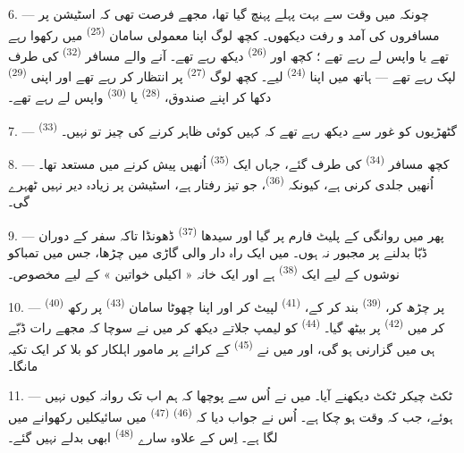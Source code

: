6. --- چونکہ میں وقت سے بہت پہلے پہنچ گیا تھا، مجھے فرصت تھی کہ
اسٹیشن پر مسافروں کی آمد و رفت دیکھوں۔ کچھ لوگ اپنا معمولی سامان
 \textsuperscript{(25)} میں رکھوا رہے تھے یا
واپس لے رہے تھے ؛ کچھ اور 
\textsuperscript{(26)} دیکھ رہے تھے۔ آنے والے مسافر 
\textsuperscript{(32)} کی طرف لپک رہے تھے — ہاتھ میں اپنا
 \textsuperscript{(24)} لیے۔ کچھ لوگ  \textsuperscript{(27)} پر انتظار کر رہے تھے اور اپنی
 \textsuperscript{(29)} دکھا کر اپنے صندوق،
 \textsuperscript{(28)} یا 
\textsuperscript{(30)} واپس لے رہے تھے۔

7. ---  \textsuperscript{(33)} گٹھڑیوں کو
غور سے دیکھ رہے تھے کہ کہیں کوئی ظاہر کرنے کی چیز تو نہیں۔

8. --- کچھ مسافر  \textsuperscript{(34)} کی طرف
گئے، جہاں ایک  \textsuperscript{(35)} اُنھیں پیش کرنے میں
مستعد تھا۔ اُنھیں جلدی کرنی ہے، کیونکہ 
\textsuperscript{(36)}، جو تیز رفتار ہے، اسٹیشن پر زیادہ دیر نہیں
ٹھہرے گی۔

9. --- پھر میں روانگی کے پلیٹ فارم پر گیا اور سیدھا 
\textsuperscript{(37)} ڈھونڈا تاکہ سفر کے دوران ڈبّا بدلنے پر مجبور نہ
ہوں۔ میں ایک راہ دار والی گاڑی میں چڑھا، جس میں تمباکو نوشوں کے لیے ایک
 \textsuperscript{(38)} ہے اور ایک خانہ « اکیلی خواتین »
کے لیے مخصوص۔

\VUsaut{3.0mm}

10. ---  \textsuperscript{(40)} پر چڑھ کر،
 \textsuperscript{(39)} بند کر کے، 
\textsuperscript{(41)} لپیٹ کر اور اپنا چھوٹا سامان 
\textsuperscript{(43)} پر رکھ کر میں 
\textsuperscript{(42)} پر بیٹھ گیا۔ 
\textsuperscript{(44)} کو لیمپ جلاتے دیکھ کر میں نے سوچا کہ مجھے رات
ڈبّے ہی میں گزارنی ہو گی، اور میں نے 
\textsuperscript{(45)} کے کرائے پر مامور اہلکار کو بلا کر ایک تکیہ
مانگا۔

11. --- ٹکٹ چیکر ٹکٹ دیکھنے آیا۔ میں نے اُس سے پوچھا کہ ہم اب تک
روانہ کیوں نہیں ہوئے، جب کہ وقت ہو چکا ہے۔ اُس نے جواب دیا کہ
 \textsuperscript{(46)} 
\textsuperscript{(47)} میں سائیکلیں رکھوانے میں لگا ہے۔ اِس کے علاوہ
سارے  \textsuperscript{(48)} ابھی بدلے
نہیں گئے۔

